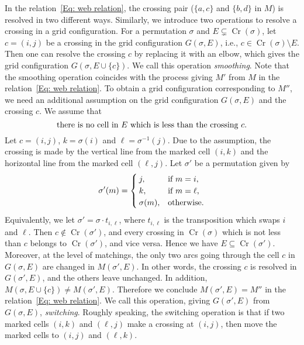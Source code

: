 \documentclass[reqno,12pt]{amsart}
\theoremstyle{definition}
\theoremstyle{remark}
\newcommand\Cr{\operatorname{Cr}}
\begin{document}
In the relation~\eqref{Eq: web relation}, the crossing pair
(\( \{a,c\} \) and \( \{b,d\} \) in \( M \)) is resolved in two different ways.
Similarly, we introduce two operations to resolve a crossing in a grid
configuration. 
For a permutation \( \sigma \) and \( E\subsetneq\Cr(\sigma) \),
let $c=(i,j)$ be a  crossing in the grid configuration $G(\sigma,E)$,
i.e., \( c\in\Cr(\sigma)\setminus E \).
Then one can resolve the crossing \( c \) by replacing it with an elbow,
which gives the grid configuration \( G(\sigma,E\cup \{c\}) \).
We call this operation \emph{smoothing}.
Note that the smoothing operation coincides with the process giving \( M' \) from
\( M \) in the relation~\eqref{Eq: web relation}.
To obtain a grid configuration corresponding to \( M'' \), we need an additional
assumption on the grid configuration \( G(\sigma, E) \) and the crossing \( c \).
We assume that
\begin{equation} \label{cond:switching_condition}
  \mbox{there is no cell in \( E \) which is less than the crossing \( c \).}
\end{equation}
Let \( c=(i,j) \), \( k=\sigma(i) \) and \( \ell=\sigma^{-1}(j) \).
Due to the assumption, the crossing is made by the vertical line
from the marked cell \( (i, k) \) and the horizontal line from the marked cell
\( (\ell,j) \).
Let \( \sigma' \) be a permutation given by
\[
  \sigma'(m) =
  \begin{cases}
    j, & \mbox{if \( m=i \),} \\
    k, & \mbox{if \( m=\ell \),} \\
    \sigma(m), & \mbox{otherwise.}
  \end{cases}
\]
Equivalently, we let \( \sigma'=\sigma \cdot t_{i,\ell} \),
where \( t_{i,\ell} \) is the transposition which swaps \( i \) and \( \ell \).
Then \( c\notin \Cr(\sigma') \), and every crossing in \( \Cr(\sigma) \) which
is not less than \( c \) belongs to \( \Cr(\sigma') \), and vice versa.
Hence we have \( E\subseteq \Cr(\sigma') \).
Moreover, at the level of matchings, the only two arcs going through the cell
\( c \) in \( G(\sigma,E) \) are changed in \( M(\sigma',E) \).
In other words, the crossing \( c \) is resolved in \( G(\sigma',E) \), and
the others leave unchanged. In addition, \( M(\sigma,E\cup\{c\})\neq M(\sigma',E)\).
Therefore we conclude \( M(\sigma',E) = M'' \) in the relation~\eqref{Eq: web relation}.
We call this operation, giving \( G(\sigma',E) \) from \( G(\sigma,E) \), \emph{switching}.
Roughly speaking, the switching operation is that if two marked cells \( (i,k) \) and
\( (\ell,j) \) make a crossing at \( (i,j) \), then move the marked cells
to \( (i,j) \) and \( (\ell,k) \).
\end{document}
